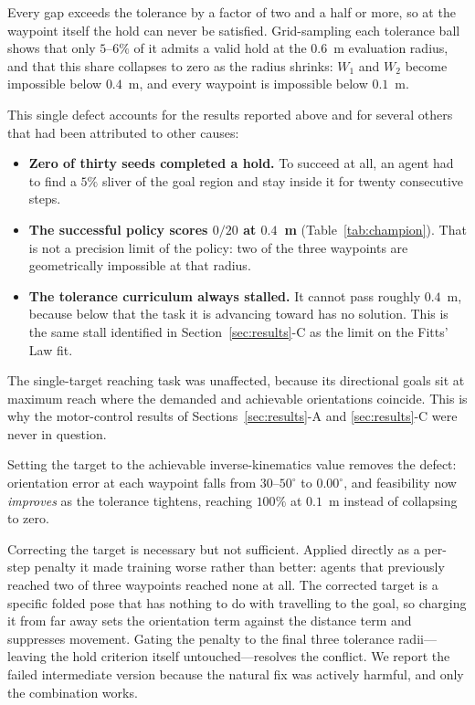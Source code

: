 \documentclass[conference]{IEEEtran}
\begin{document}
Every gap exceeds the tolerance by a factor of two and a half or more, so at
the waypoint itself the hold can never be satisfied. Grid-sampling each
tolerance ball shows that only $5$--$6\%$ of it admits a valid hold at the
$0.6$~m evaluation radius, and that this share collapses to zero as the radius
shrinks: $W_1$ and $W_2$ become impossible below $0.4$~m, and every waypoint is
impossible below $0.1$~m.

This single defect accounts for the results reported above and for several
others that had been attributed to other causes:

\begin{itemize}
\item \textbf{Zero of thirty seeds completed a hold.} To succeed at all, an
agent had to find a $5\%$ sliver of the goal region and stay inside it for
twenty consecutive steps.
\item \textbf{The successful policy scores $0/20$ at $0.4$~m}
(Table~\ref{tab:champion}). That is not a precision limit of the policy: two
of the three waypoints are geometrically impossible at that radius.
\item \textbf{The tolerance curriculum always stalled.} It cannot pass roughly
$0.4$~m, because below that the task it is advancing toward has no solution.
This is the same stall identified in Section~\ref{sec:results}-C as the limit
on the Fitts' Law fit.
\end{itemize}

The single-target reaching task was unaffected, because its directional goals
sit at maximum reach where the demanded and achievable orientations coincide.
This is why the motor-control results of
Sections~\ref{sec:results}-A and \ref{sec:results}-C were never in question.

Setting the target to the achievable inverse-kinematics value removes the
defect: orientation error at each waypoint falls from $30$--$50^{\circ}$ to
$0.00^{\circ}$, and feasibility now \emph{improves} as the tolerance tightens,
reaching $100\%$ at $0.1$~m instead of collapsing to zero.

Correcting the target is necessary but not sufficient. Applied directly as a
per-step penalty it made training worse rather than better: agents that
previously reached two of three waypoints reached none at all. The corrected
target is a specific folded pose that has nothing to do with travelling to the
goal, so charging it from far away sets the orientation term against the
distance term and suppresses movement. Gating the penalty to the final three
tolerance radii---leaving the hold criterion itself untouched---resolves the
conflict. We report the failed intermediate version because the natural fix
was actively harmful, and only the combination works.
\end{document}
